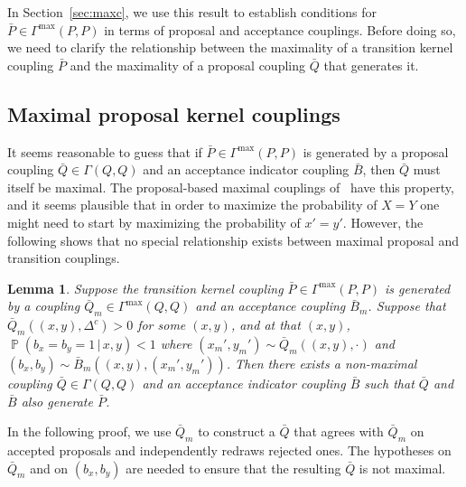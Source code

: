 \documentclass[aihp]{imsart}
\theoremstyle{plain}
\newtheorem{lemma}[theorem]{Lemma}
\theoremstyle{remark}
\theoremstyle{definition} \newtheorem{example}{Example}
\renewcommand{\P}{\operatorname{\mathbb{P}}}
\newcommand{\cd}{\cdot}
\newcommand{\g}{\, | \,}
\newcommand{\bp}{\bar P}
\newcommand{\bq}{\bar Q}
\newcommand{\bb}{\bar B}
\newcommand{\xy}{(x,y)}
\newcommand{\bxy}{(b_x,b_y)}
\newcommand{\Gmax}{\Gamma^\mathrm{max}}
\begin{document}
In Section~\ref{sec:maxc}, we use this result to establish conditions for $\bp \in \Gmax(P,P)$ in
terms of proposal and acceptance couplings. Before doing so, we need to clarify the relationship
between the maximality of a transition kernel coupling $\bp$ and the maximality of a proposal
coupling $\bq$ that generates it.

\subsection{Maximal proposal kernel couplings}
\label{sec:maxprop}

It seems reasonable to guess that if $\bp \in \Gmax(P,P)$ is generated by a proposal coupling $\bq
\in \Gamma(Q,Q)$ and an acceptance indicator coupling $\bb$, then $\bq$ must itself be maximal. The
proposal-based maximal couplings of~\citet{OLeary2020} have this property, and it seems plausible
that in order to maximize the probability of $X=Y$ one might need to start by maximizing the
probability of $x'=y'$. However, the following shows that no special relationship exists between
maximal proposal and transition couplings.

\smallskip

\begin{lemma}
\label{lem:maxtonon} Suppose the transition kernel coupling $\bp \in \Gmax(P,P)$ is generated by a
coupling ${\bq_m \in \Gmax(Q,Q)}$ and an acceptance coupling $\bb_m$. Suppose that $\bq_m(\xy,
\Delta^c) > 0$ for some $\xy$, and at that $\xy$, ${\P(b_x = b_y = 1 \g x,y) < 1}$ where
$(x_m',y_m') \sim \bq_m(\xy,\cd)$ and $(b_x,b_y) \sim \bb_m(\xy, (x_m',y_m'))$. Then there exists a
non-maximal coupling $\bq \in \Gamma(Q,Q)$ and an acceptance indicator coupling $\bb$ such that
$\bq$ and $\bb$ also generate $\bp$.
\end{lemma}

In the following proof, we use $\bq_m$ to construct a $\bq$ that agrees with $\bq_m$ on accepted
proposals and independently redraws rejected ones. The hypotheses on $\bq_m$ and on $\bxy$ are
needed to ensure that the resulting $\bq$ is not maximal.
\end{document}
